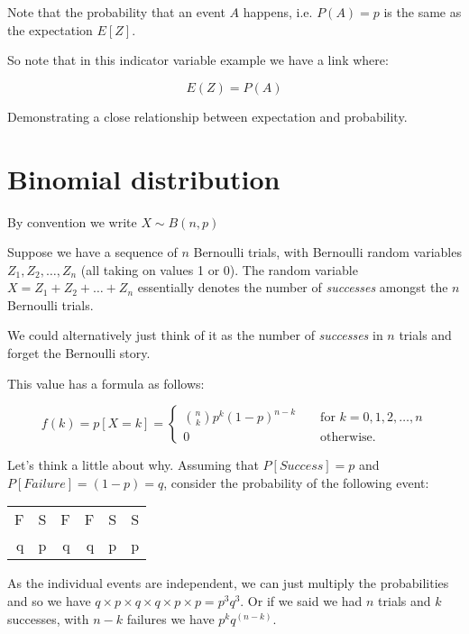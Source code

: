 \documentclass[12pt]{extbook}
\begin{document}
Note that the probability that an event $A$ happens, i.e. $P(A)=p$ is the same as the expectation $E[Z]$.

So note that in this indicator variable example we have a link where:

\begin{displaymath}
E(Z) = P(A)
\end{displaymath}

Demonstrating a close relationship between expectation and probability.

\section{Binomial distribution}

{\color{green}By convention we write $X \sim B(n, p)$}


Suppose we have a sequence of $n$ Bernoulli trials, with Bernoulli
random variables $Z_1, Z_2, \ldots, Z_n$ (all taking on values 1 or
0).   The random variable $X=Z_1 + Z_2 + \ldots + Z_n$ essentially
denotes the number of \emph{successes} amongst the $n$ Bernoulli
trials.

We could alternatively just think of it as the number of \emph{successes} in $n$ trials and forget the Bernoulli story.

This value has a formula as follows:

\begin{displaymath}
f(k) = p[X=k] = \left\{  \begin{array}{crr}  {n \choose k} p^k (1-p)^{n-k} & &  \mbox{ for }
k=0,1,2,\ldots,n \\
0 & & \mbox{ otherwise.} \end{array} \right.
\end{displaymath}


Let's think a little about why.   Assuming that $P[Success]=p$ and $P[Failure] = (1-p) = q$, consider the probability of the following event:

\begin{tabular}{rrrrrr}
F & S & F & F & S & S \\
q & p & q & q & p & p \\
\end{tabular}

As the individual events are independent, we can just multiply the probabilities and so we have $q \times p \times q \times q \times p \times p = p^3q^3$.   Or if we said we had $n$ trials and $k$ successes, with $n-k$ failures we have $p^k  q^{(n-k)}$.
\end{document}
